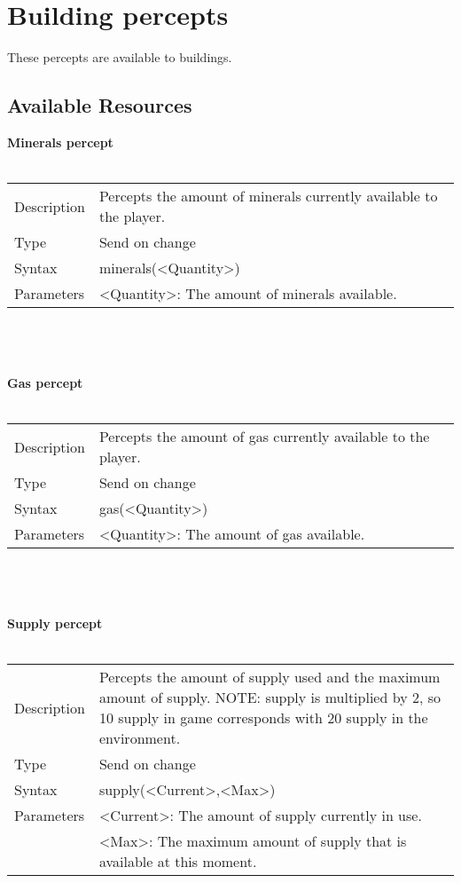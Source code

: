 \documentclass[english,11pt]{report}
\begin{document}
\newpage
\section{Building percepts}
These percepts are available to buildings.

\subsection{Available Resources}
\textbf{Minerals percept}\\
\\
\begin{tabularx}{\textwidth}{lX}
 Description & Percepts the amount of minerals currently available to the player. \\
 Type & Send on change \\
 Syntax & minerals(<Quantity>) \\
 Parameters &   <Quantity>: The amount of minerals available.
\end{tabularx}\\
\\
\\
\textbf{Gas percept}\\
\\
\begin{tabularx}{\textwidth}{lX}
 Description & Percepts the amount of gas currently available to the player. \\
 Type & Send on change \\
 Syntax & gas(<Quantity>) \\
 Parameters &   <Quantity>: The amount of gas available.
\end{tabularx}\\
\\
\\
\textbf{Supply percept}\\
\\
\begin{tabularx}{\textwidth}{lX}
 Description & Percepts the amount of supply used and the maximum amount of supply. NOTE: supply is multiplied by 2, so 10 supply in game corresponds with 20 supply in the environment. \\
 Type & Send on change \\
 Syntax & supply(<Current>,<Max>) \\
 Parameters &   <Current>: The amount of supply currently in use.\\
            &   <Max>: The maximum amount of supply that is available at this moment.
\end{tabularx}
\end{document}
